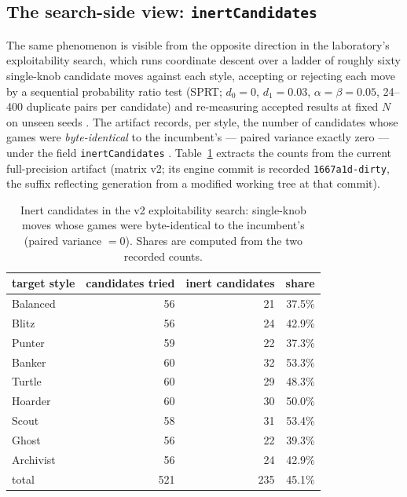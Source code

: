 \documentclass[11pt]{article}
\newcommand{\code}[1]{\texttt{#1}}
\begin{document}
\subsection{The search-side view: \code{inertCandidates}}
\label{sec:inertcand}

The same phenomenon is visible from the opposite direction in the laboratory's exploitability
search, which runs coordinate descent over a ladder of roughly sixty single-knob candidate moves
against each style, accepting or rejecting each move by a sequential probability ratio test
(SPRT; $d_0 = 0$, $d_1 = 0.03$, $\alpha = \beta = 0.05$, 24--400 duplicate pairs per candidate)
and re-measuring accepted results at fixed $N$ on unseen seeds \cite{exploit, botlab, wald}. The
artifact records, per style, the number of candidates whose games were \emph{byte-identical} to
the incumbent's --- paired variance exactly zero --- under the field \code{inertCandidates}
\cite{results}. Table~\ref{tab:inert} extracts the counts from the current full-precision
artifact (matrix v2; its engine commit is recorded \code{1667a1d-dirty}, the suffix reflecting
generation from a modified working tree at that commit).

\begin{table}[ht]
\centering
\caption{Inert candidates in the v2 exploitability search: single-knob moves whose games were
byte-identical to the incumbent's (paired variance $= 0$). Shares are computed from the two
recorded counts.}
\label{tab:inert}
\begin{tabular}{lrrr}
\toprule
target style & candidates tried & inert candidates & share \\
\midrule
Balanced & 56 & 21 & 37.5\% \\
Blitz & 56 & 24 & 42.9\% \\
Punter & 59 & 22 & 37.3\% \\
Banker & 60 & 32 & 53.3\% \\
Turtle & 60 & 29 & 48.3\% \\
Hoarder & 60 & 30 & 50.0\% \\
Scout & 58 & 31 & 53.4\% \\
Ghost & 56 & 22 & 39.3\% \\
Archivist & 56 & 24 & 42.9\% \\
\midrule
total & 521 & 235 & 45.1\% \\
\bottomrule
\end{tabular}
\end{table}
\end{document}
